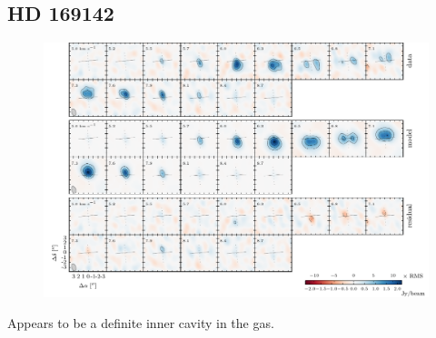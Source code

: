 \documentclass[twocolumn]{aastex6}
\begin{document}
\subsection{HD 169142}

\begin{figure}[htb]
\begin{center}
  \includegraphics{HD169142.pdf}
  \end{center}
\end{figure}

Appears to be a definite inner cavity in the gas.
\end{document}
